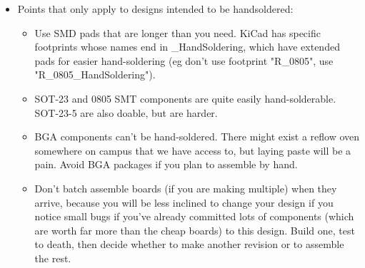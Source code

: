 \documentclass{article}
\begin{document}
\begin{itemize}
\item Points that only apply to designs intended to be handsoldered:
\begin{itemize}
\item Use SMD pads that are longer than you need. KiCad has specific footprints whose names end in \_HandSoldering, which have extended pads for easier hand-soldering (eg don't use footprint "R\_0805", use "R\_0805\_HandSoldering").
\item SOT-23 and 0805 SMT components are quite easily hand-solderable. SOT-23-5 are also doable, but are harder.
\item BGA components can't be hand-soldered. There might exist a reflow oven somewhere on campus that we have access to, but laying paste will be a pain. Avoid BGA packages if you plan to assemble by hand.
\item Don't batch assemble boards (if you are making multiple) when they arrive, because you will be less inclined to change your design if you notice small bugs if you've already committed lots of components (which are worth far more than the cheap boards) to this design. Build one, test to death, then decide whether to make another revision or to assemble the rest.
\end{itemize}
\end{itemize}

\end{document}
